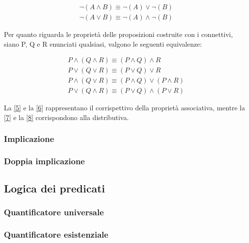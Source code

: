 \documentclass{article}
\begin{document}
\begin{center}
  \vspace{-1.5em}
  \begin{align}
    \neg(A \land B) \equiv \neg(A) \lor \neg(B) \label{3} \\
    \neg(A \lor B) \equiv \neg(A) \land \neg(B) \label{4}
  \end{align}
\end{center}
Per quanto riguarda le proprietà delle proposizioni costruite con i connettivi, 
siano P, Q e R enunciati qualsiasi, valgono le seguenti equivalenze:
\begin{center}
  \vspace{-1.5em}
  \begin{align}
    P \land (Q \land R) \equiv (P \land Q) \land R \label{5}\\
    P \lor (Q \lor R) \equiv (P \lor Q) \lor R \label{6} \\
    P \land (Q \lor R) \equiv (P \land Q) \lor (P \land R) \label{7} \\
    P \lor (Q \land R) \equiv (P \lor Q) \land (P \lor R) \label{8}
  \end{align}
\end{center}

La \eqref{5} e la \eqref{6} rappresentano il corrispettivo della proprietà associativa,
mentre la \eqref{7} e la \eqref{8} corrispondono alla distributiva.

\subsubsection{Implicazione}




\subsubsection{Doppia implicazione}


\subsection{Logica dei predicati}

\subsubsection{Quantificatore universale}
\subsubsection{Quantificatore esistenziale}
\end{document}
